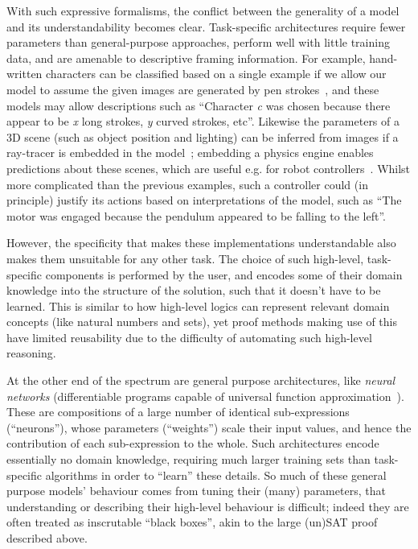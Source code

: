 \documentclass[letterpaper]{article}
\begin{document}
With such expressive formalisms, the conflict between the generality
of a model and its understandability becomes clear. Task-specific
architectures require fewer parameters than general-purpose approaches, perform
well with little training data, and are amenable to descriptive framing
information. For example, hand-written characters can be classified based on a
single example if we allow our model to assume the given images are generated by
pen strokes~\cite{lake2015human}, and these models may allow descriptions such
as ``Character {\em c} was chosen because there appear to be {\em x} long
strokes, {\em y} curved strokes, etc''. Likewise the parameters of a 3D scene
(such as object position and lighting) can be inferred from images if a
ray-tracer is embedded in the model~\cite{li2018differentiable}; embedding a
physics engine enables predictions about these scenes, which are useful e.g. for
robot controllers~\cite{degrave2016differentiable}. Whilst more complicated than
the previous examples, such a controller could (in principle) justify its
actions based on interpretations of the model, such as ``The motor was engaged
because the pendulum appeared to be falling to the left''.

However, the specificity that makes these implementations understandable also
makes them unsuitable for any other task. The choice of such high-level,
task-specific components is performed by the user, and encodes some of their
domain knowledge into the structure of the solution, such that it doesn't have
to be learned. This is similar to how high-level logics can represent relevant
domain concepts (like natural numbers and sets), yet proof methods making use of
this have limited reusability due to the difficulty of automating such
high-level reasoning.

At the other end of the spectrum are general purpose architectures, like
\emph{neural networks} (differentiable programs capable of universal function
approximation~\cite{funahashi1989approximate}). These are compositions of a
large number of identical sub-expressions (``neurons''), whose parameters
(``weights'') scale their input values, and hence the contribution of each
sub-expression to the whole. Such architectures encode essentially no domain
knowledge, requiring much larger training sets than task-specific algorithms in
order to ``learn'' these details.  So much of these general purpose models'
behaviour comes from tuning their (many) parameters, that understanding or
describing their high-level behaviour is difficult; indeed they are often
treated as inscrutable ``black boxes'', akin to the large (un)SAT proof
described above.
\end{document}
